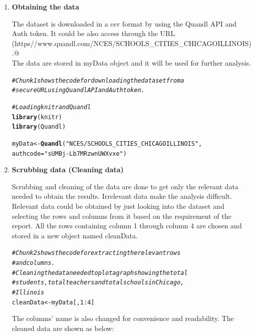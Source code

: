 \documentclass{article}\usepackage[]{graphicx}\usepackage[]{color}
\makeatletter
\newcommand{\hlnum}[1]{\textcolor[rgb]{0.686,0.059,0.569}{#1}}%
\newcommand{\hlstr}[1]{\textcolor[rgb]{0.192,0.494,0.8}{#1}}%
\newcommand{\hlcom}[1]{\textcolor[rgb]{0.678,0.584,0.686}{\textit{#1}}}%
\newcommand{\hlopt}[1]{\textcolor[rgb]{0,0,0}{#1}}%
\newcommand{\hlstd}[1]{\textcolor[rgb]{0.345,0.345,0.345}{#1}}%
\newcommand{\hlkwb}[1]{\textcolor[rgb]{0.69,0.353,0.396}{#1}}%
\newcommand{\hlkwc}[1]{\textcolor[rgb]{0.333,0.667,0.333}{#1}}%
\newcommand{\hlkwd}[1]{\textcolor[rgb]{0.737,0.353,0.396}{\textbf{#1}}}%
\newenvironment{kframe}{%
 \def\at@end@of@kframe{}%
 \ifinner\ifhmode%
  \def\at@end@of@kframe{\end{minipage}}%
  \begin{minipage}{\columnwidth}%
 \fi\fi%
 \def\FrameCommand##1{\hskip\@totalleftmargin \hskip-\fboxsep
 \colorbox{shadecolor}{##1}\hskip-\fboxsep
     \hskip-\linewidth \hskip-\@totalleftmargin \hskip\columnwidth}%
 \MakeFramed {\advance\hsize-\width
   \@totalleftmargin\z@ \linewidth\hsize
   \@setminipage}}%
 {\par\unskip\endMakeFramed%
 \at@end@of@kframe}
\newenvironment{knitrout}{}{} %
\makeatother
\begin{document}
\begin{enumerate}
    \item \textbf{Obtaining the data}

The dataset is downloaded in a csv format by using the Quandl API and Auth token.
It could be also access through the URL 
\\\verb@(https//www.quandl.com/NCES/SCHOOLS_CITIES_CHICAGOILLINOIS).@
\\ The data are stored in myData object and it will be used for further analysis.

\begin{knitrout}
\color{fgcolor}\begin{kframe}
\begin{alltt}
\hlcom{# Chunk1 shows the code for downloading the dataset from a }
\hlcom{# secure URL using Quandl API and Auth token.}

\hlcom{# Loading knitr and Quandl}
\hlkwd{library}\hlstd{(knitr)}
\hlkwd{library}\hlstd{(Quandl)}

\hlstd{myData} \hlkwb{<-} \hlkwd{Quandl}\hlstd{(}\hlstr{"NCES/SCHOOLS_CITIES_CHICAGOILLINOIS"}\hlstd{,}
                 \hlkwc{authcode}\hlstd{=}\hlstr{"sUMBj-Lb7MRzwnUWXvxe"}\hlstd{)}
\end{alltt}
\end{kframe}
\end{knitrout}
\item \textbf{Scrubbing data (Cleaning data)}
 
Scrubbing and cleaning of the data are done to get only the relevant data needed to obtain the results. Irrelevant data make the analysis difficult. Relevant data could be obtained by just looking into the dataset and selecting the rows and columns from it based on the requirement of the report. All the rows containing column 1 through column 4 are chosen and stored in a new object named cleanData.


\begin{knitrout}
\color{fgcolor}\begin{kframe}
\begin{alltt}
\hlcom{# Chunk2 shows the code for extracting the relevant rows }
\hlcom{# and columns.}
\hlcom{# Cleaning the data needed to plot a graph showing the total }
\hlcom{# students, total teachers and total schools in Chicago, }
\hlcom{# Illinois}
\hlstd{cleanData}\hlkwb{<-}\hlstd{myData[,}\hlnum{1}\hlopt{:}\hlnum{4}\hlstd{]}
\end{alltt}
\end{kframe}
\end{knitrout}
The columns' name is also changed for convenience and readability. The cleaned data are shown as below:



\end{enumerate}
\end{document}
